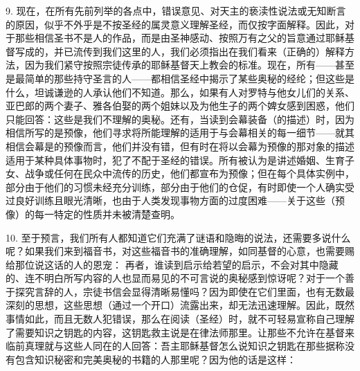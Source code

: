 9. 现在，在所有先前列举的各点中，错误意见、对天主的亵渎性说法或无知断言的原因，似乎不外乎是不按圣经的属灵意义理解圣经，而仅按字面解释。因此，对于那些相信圣书不是人的作品，而是由圣神感动、按照万有之父的旨意通过耶稣基督写成的，并已流传到我们这里的人，我们必须指出在我们看来（正确的）解释方法，因为我们紧守按照宗徒传承的耶稣基督天上教会的标准。现在，所有——甚至是最简单的那些持守圣言的人——都相信圣经中揭示了某些奥秘的经纶；但这些是什么，坦诚谦逊的人承认他们不知道。那么，如果有人对罗特与他女儿们的关系、亚巴郎的两个妻子、雅各伯娶的两个姐妹以及为他生子的两个婢女感到困惑，他们只能回答：这些是我们不理解的奥秘。还有，当读到会幕装备（的描述）时，因为相信所写的是预像，他们寻求将所能理解的适用于与会幕相关的每一细节——就其相信会幕是的预像而言，他们并没有错，但有时在将以会幕为预像的那对象的描述适用于某种具体事物时，犯了不配于圣经的错误。所有被认为是讲述婚姻、生育子女、战争或任何在民众中流传的历史，他们都宣布为预像；但在每个具体实例中，部分由于他们的习惯未经充分训练，部分由于他们的仓促，有时即使一个人确实受过良好训练且眼光清晰，也由于人类发现事物方面的过度困难——关于这些（预像）的每一特定的性质并未被清楚查明。\par

10. 至于预言，我们所有人都知道它们充满了谜语和隐晦的说法，还需要多说什么呢？如果我们来到福音书，对这些福音书的准确理解，如同基督的心意，也需要赐给那位说这话的人的恩宠： 再者，谁读到启示给若望的启示，不会对其中隐藏的、连不明白所写内容的人也显而易见的不可言说的奥秘感到惊讶呢？对于一个善于探究言辞的人，宗徒书信会显得清晰易懂吗？因为即使在它们里面，也有无数最深刻的思想，这些思想（通过一个开口）流露出来，却无法迅速理解。因此，既然事情如此，而且无数人犯错误，那么在阅读（圣经）时，就不可轻易宣称自己理解了需要知识之钥匙的内容，这钥匙救主说是在律法师那里。让那些不允许在基督来临前真理就与这些人同在的人回答：吾主耶稣基督怎么说知识之钥匙在那些据称没有包含知识秘密和完美奥秘的书籍的人那里呢？因为他的话是这样：\par

